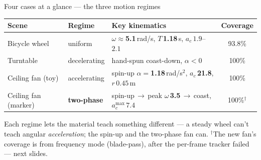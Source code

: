 \documentclass[aspectratio=169,10pt]{beamer}
\newcommand{\hl}[1]{{\bfseries\color{cAccent}#1}}
\begin{document}
\begin{frame}{Four cases at a glance --- the three motion regimes}
\small
\begin{center}
{\footnotesize
\begin{tabular}{lllc}
\toprule
\textbf{Scene} & \textbf{Regime} & \textbf{Key kinematics} & \textbf{Coverage} \\
\midrule
Bicycle wheel        & uniform              & $\omega\!\approx\!$\hl{5.1}\,rad/s, $T\,$\hl{1.18}\,s, $a_c\,1.9$--$2.1$ & 93.8\% \\
Turntable            & decelerating         & hand-spun coast-down, $\alpha\!<\!0$                       & 100\% \\
Ceiling fan (toy)    & accelerating         & spin-up $\alpha=$\hl{1.18}\,rad/s$^2$, $a_c\,$\hl{21.8}, $r\,0.45$\,m & 100\% \\
\rowcolor{cMeas!8}
Ceiling fan (marker) & \textbf{two-phase}   & spin-up\,$\to$\,peak $\omega\,$\hl{3.5}\,$\to$\,coast, $a_c^{\max}\,7.4$ & 100\%$^\dagger$ \\
\bottomrule
\end{tabular}}
\end{center}
\vspace{0.5em}
{\scriptsize Each regime lets the material teach something different --- a steady wheel can't teach
angular \emph{acceleration}; the spin-up and the two-phase fan can. $^\dagger$The new fan's coverage is
from frequency mode (blade-pass), after the per-frame tracker failed --- next slides.}
\end{frame}
\end{document}
